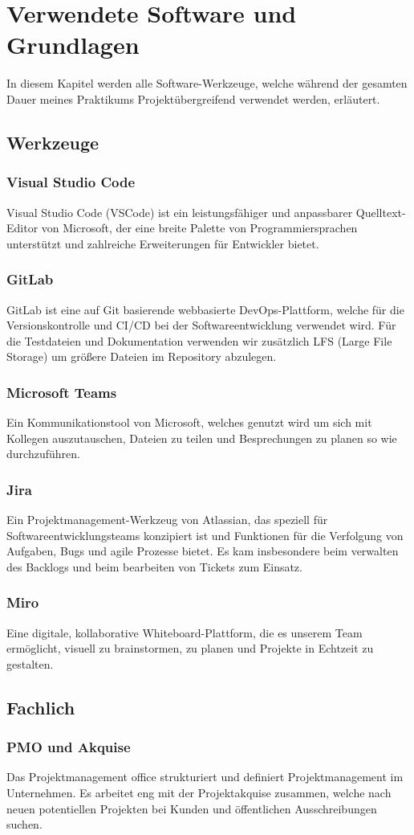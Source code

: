 \section{Verwendete Software und Grundlagen}
In diesem Kapitel werden alle Software-Werkzeuge, welche während der gesamten Dauer meines Praktikums Projektübergreifend
verwendet werden, erläutert.


\subsection{Werkzeuge}

\subsubsection{Visual Studio Code}
Visual Studio Code (VSCode) ist ein leistungsfähiger und anpassbarer Quelltext-Editor von Microsoft, der eine breite
Palette von Programmiersprachen unterstützt und zahlreiche Erweiterungen für Entwickler bietet. 

\subsubsection{GitLab}
GitLab ist eine auf Git basierende webbasierte DevOps-Plattform, welche für die Versionskontrolle und CI/CD bei der
Softwareentwicklung verwendet wird. Für die Testdateien und Dokumentation verwenden wir zusätzlich LFS (Large File
Storage) um größere Dateien im Repository abzulegen.

\subsubsection{Microsoft Teams}
Ein Kommunikationstool von Microsoft, welches genutzt wird um sich mit Kollegen auszutauschen, Dateien zu teilen und
Besprechungen zu planen so wie durchzuführen.

\subsubsection{Jira}
Ein Projektmanagement-Werkzeug von Atlassian, das speziell für Softwareentwicklungsteams konzipiert ist und Funktionen
für die Verfolgung von Aufgaben, Bugs und agile Prozesse bietet. Es kam insbesondere beim verwalten des Backlogs und
beim bearbeiten von Tickets zum Einsatz.

\subsubsection{Miro}
Eine digitale, kollaborative Whiteboard-Plattform, die es unserem Team ermöglicht, visuell zu brainstormen, zu planen
und Projekte in Echtzeit zu gestalten.

\subsection{Fachlich}

\subsubsection{PMO und Akquise}
Das Projektmanagement office strukturiert und definiert Projektmanagement im Unternehmen. Es arbeitet eng mit der
Projektakquise zusammen, welche nach neuen potentiellen Projekten bei Kunden und öffentlichen Ausschreibungen suchen.